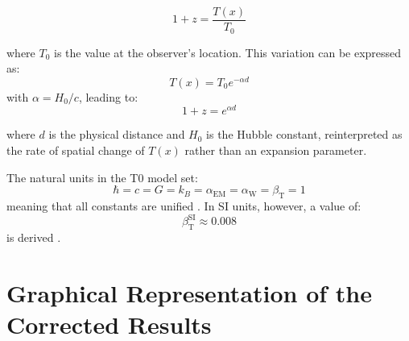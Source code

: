 \documentclass[a4paper,12pt]{article}
\begin{document}
	\begin{equation}
		1 + z = \frac{T(x)}{T_0}
	\end{equation}
	
	where \( T_0 \) is the value at the observer's location. This variation can be expressed as:
	\begin{equation}
		T(x) = T_0 e^{-\alpha d}
	\end{equation}
	with \( \alpha = H_0 / c \), leading to:
	\begin{equation}
		1 + z = e^{\alpha d}
	\end{equation}
	
	where \( d \) is the physical distance and \( H_0 \) is the Hubble constant, reinterpreted as the rate of spatial change of \( T(x) \) rather than an expansion parameter.
	
	The natural units in the T0 model set:
	\[
	\hbar = c = G = k_B = \alpha_{\text{EM}} = \alpha_{\text{W}} = \beta_{\text{T}} = 1
	\]
	meaning that all constants are unified \cite{Pascher2025c}. In SI units, however, a value of:
	\[
	\beta_{\text{T}}^{\text{SI}} \approx 0.008
	\]
	is derived \cite{Pascher2025d}.
	
	\section{Graphical Representation of the Corrected Results}
	
\end{document}
